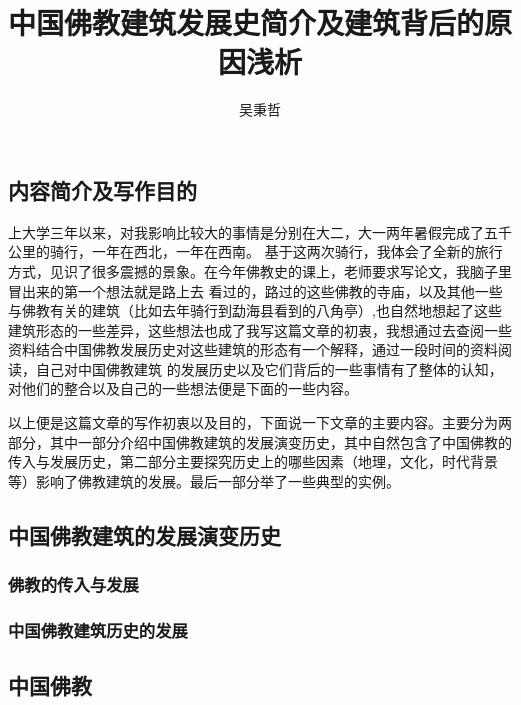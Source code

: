 \documentclass[10pt,a4paper]{ctexart}
\author{吴秉哲}
\title{中国佛教建筑发展史简介及建筑背后的原因浅析}
\begin{document}
	\maketitle
\subsection*{内容简介及写作目的}
上大学三年以来，对我影响比较大的事情是分别在大二，大一两年暑假完成了五千公里的骑行，一年在西北，一年在西南。
基于这两次骑行，我体会了全新的旅行方式，见识了很多震撼的景象。在今年佛教史的课上，老师要求写论文，我脑子里冒出来的第一个想法就是路上去
看过的，路过的这些佛教的寺庙，以及其他一些与佛教有关的建筑（比如去年骑行到勐海县看到的八角亭）,也自然地想起了这些建筑形态的一些差异，这些想法也成了我写这篇文章的初衷，我想通过去查阅一些资料结合中国佛教发展历史对这些建筑的形态有一个解释，通过一段时间的资料阅读，自己对中国佛教建筑
的发展历史以及它们背后的一些事情有了整体的认知，对他们的整合以及自己的一些想法便是下面的一些内容。

以上便是这篇文章的写作初衷以及目的，下面说一下文章的主要内容。主要分为两部分，其中一部分介绍中国佛教建筑的发展演变历史，其中自然包含了中国佛教的传入与发展历史，第二部分主要探究历史上的哪些因素（地理，文化，时代背景等）影响了佛教建筑的发展。最后一部分举了一些典型的实例。
\subsection*{中国佛教建筑的发展演变历史}
\subsubsection*{佛教的传入与发展}
\subsubsection*{中国佛教建筑历史的发展}
\subsection*{中国佛教}
\end{document}
